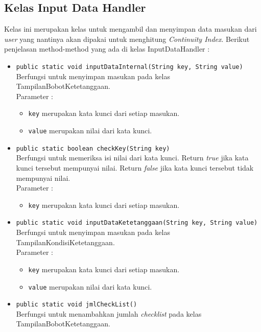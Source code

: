 \subsection{Kelas Input Data Handler}
Kelas ini merupakan kelas untuk mengambil dan menyimpan data masukan dari \textit{user} yang nantinya akan dipakai untuk menghitung \textit{Continuity Index}.
Berikut penjelasan method-method yang ada di kelas InputDataHandler :
	\begin{itemize}
		\item \texttt{public static void inputDataInternal(String key, String value)}\\
		Berfungsi untuk menyimpan masukan pada kelas TampilanBobotKetetanggaan.\\
		Parameter :
		\begin{itemize}
			\item \texttt{key} merupakan kata kunci dari setiap masukan.
			\item \texttt{value} merupakan nilai dari kata kunci.
		\end{itemize}
		
		\item \texttt{public static boolean checkKey(String key)}\\
		Berfungsi untuk memeriksa isi nilai dari kata kunci. Return \textit{true} jika kata kunci tersebut mempunyai nilai. Return \textit{false} jika kata kunci tersebut tidak mempunyai nilai.\\
		Parameter :
		\begin{itemize}
			\item \texttt{key} merupakan kata kunci dari setiap masukan.
		\end{itemize}
		
		\item \texttt{public static void inputDataKetetanggaan(String key, String value)}\\
		Berfungsi untuk menyimpan masukan pada kelas TampilanKondisiKetetanggaan.\\
		Parameter :
		\begin{itemize}
			\item \texttt{key} merupakan kata kunci dari setiap masukan.
			\item \texttt{value} merupakan nilai dari kata kunci.
		\end{itemize}
		
		\item \texttt{public static void jmlCheckList()}\\
		Berfungsi untuk menambahkan jumlah \textit{checklist} pada kelas TampilanBobotKetetanggaan.
		

\end{itemize}
